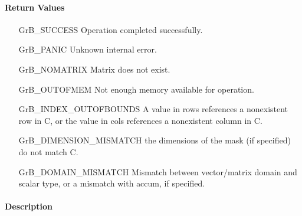\paragraph{Return Values}

\begin{itemize}[leftmargin=2.1in]
\item[{\sf GrB\_SUCCESS}]             Operation completed successfully.
\item[{\sf GrB\_PANIC}]               Unknown internal error.
\item[{\sf GrB\_NOMATRIX}]            Matrix does not exist.
\item[{\sf GrB\_OUTOFMEM}]            Not enough memory available for operation.
\item[{\sf GrB\_INDEX\_OUTOFBOUNDS}]
        A value in {\sf rows} references a nonexistent row in {\sf C}, or
        the value in {\sf cols} references a nonexistent column in {\sf C}.
\item[{\sf GrB\_DIMENSION\_MISMATCH}] 
        the dimensions of the mask (if specified) do not match {\sf C}.
\item[{\sf GrB\_DOMAIN\_MISMATCH}]    Mismatch between vector/matrix domain and scalar type,
                                      or a mismatch with {\sf accum}, if specified.
\end{itemize}


\paragraph{Description}
